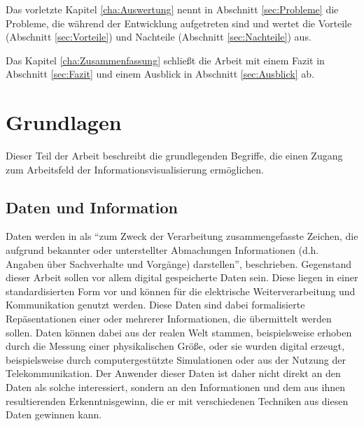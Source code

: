 \documentclass[a4paper, 12pt, DIVcalc, onepage, pdftex, headsepline, footsepline]{scrreprt}
\begin{document}
Das vorletzte Kapitel \ref{cha:Auswertung} nennt in Abschnitt \ref{sec:Probleme} die Probleme, die während
der Entwicklung aufgetreten sind und wertet die Vorteile (Abschnitt \ref{sec:Vorteile}) und Nachteile
(Abschnitt \ref{sec:Nachteile}) aus.

Das Kapitel \ref{cha:Zusammenfassung} schließt die Arbeit mit einem Fazit in Abschnitt \ref{sec:Fazit} und
einem Ausblick in Abschnitt \ref{sec:Ausblick} ab.

\chapter{Grundlagen}
\label{cha:Grundlagen}
Dieser Teil der Arbeit beschreibt die grundlegenden Begriffe, die einen Zugang
zum Arbeitsfeld der Informationsvisualisierung ermöglichen.
\section{Daten und Information}
\label{sec:DatenInfo}
Daten werden in \citep{Gabler} als "`zum Zweck der Verarbeitung zusammengefasste Zeichen,
die aufgrund bekannter oder unterstellter Abmachungen
Informationen (d.h. Angaben über Sachverhalte und Vorgänge) darstellen"', beschrieben.
Gegenstand dieser Arbeit sollen vor allem digital gespeicherte Daten sein.
Diese liegen in einer standardisierten Form vor und können für die elektrische Weiterverarbeitung
und Kommunikation genutzt werden. Diese Daten sind dabei formalisierte Repäsentationen einer
oder mehrerer Informationen, die übermittelt werden sollen.
Daten können dabei aus der realen Welt stammen, beispielsweise erhoben durch
die Messung einer physikalischen Größe, oder sie wurden digital erzeugt, beispielsweise durch
computergestützte Simulationen oder aus der Nutzung der Telekommunikation.
Der Anwender dieser Daten ist daher nicht direkt an den Daten als solche interessiert, sondern
an den Informationen und dem aus ihnen resultierenden Erkenntnisgewinn, die er mit verschiedenen
Techniken aus diesen Daten gewinnen kann.
\end{document}
